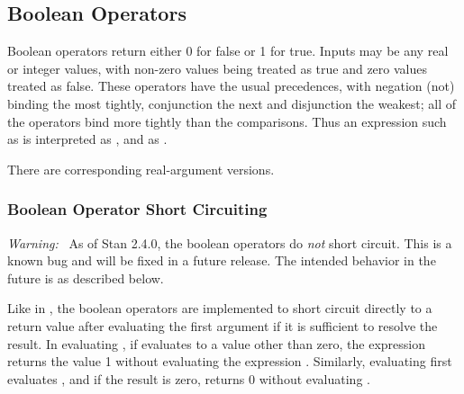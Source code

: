 \subsection{Boolean Operators}

Boolean operators return either 0 for false or 1 for true.  Inputs may
be any real or integer values, with non-zero values being treated as
true and zero values treated as false.  These operators have the usual
precedences, with negation (not) binding the most tightly, conjunction
the next and disjunction the weakest; all of the operators bind more
tightly than the comparisons.  Thus an expression such as
 is interpreted as , and
 as
.
%
\begin{description}
\end{description}
%
There are corresponding real-argument versions.
%
\begin{description}
\end{description}


\subsubsection{Boolean Operator Short Circuiting}

{\it Warning:} \ As of Stan 2.4.0, the boolean operators do {\it not}
short circuit.  This is a known bug and will be fixed in a future
release.  The intended behavior in the future is as described below.

Like in \Cpp, the boolean operators are implemented to short circuit
directly to a return value after evaluating the first argument if it
is sufficient to resolve the result.  In evaluating , if
 evaluates to a value other than zero, the expression returns
the value 1 without evaluating the expression .  Similarly,
evaluating  first evaluates , and if the result
is zero, returns 0 without evaluating .





